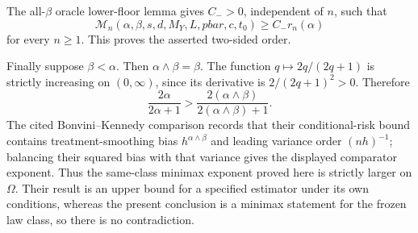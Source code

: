 The all-\(\beta\) oracle lower-floor lemma gives \(C_->0\), independent of \(n\), such that
\[
\mathcal M_n(\alpha,\beta,s,d,M_Y,L,pbar,c,t_0)
\ge C_-r_n(\alpha)
\]
for every \(n\ge1\). This proves the asserted two-sided order.

Finally suppose \(\beta<\alpha\). Then \(\alpha\wedge\beta=\beta\). The function \(q\mapsto2q/(2q+1)\) is strictly increasing on \((0,\infty)\), since its derivative is \(2/(2q+1)^2>0\). Therefore
\[
\frac{2\alpha}{2\alpha+1}
>
\frac{2(\alpha\wedge\beta)}{2(\alpha\wedge\beta)+1}.
\]
The cited Bonvini--Kennedy comparison records that their conditional-risk bound contains treatment-smoothing bias \(h^{\alpha\wedge\beta}\) and leading variance order \((nh)^{-1}\); balancing their squared bias with that variance gives the displayed comparator exponent. Thus the same-class minimax exponent proved here is strictly larger on \(\Omega\). Their result is an upper bound for a specified estimator under its own conditions, whereas the present conclusion is a minimax statement for the frozen law class, so there is no contradiction.